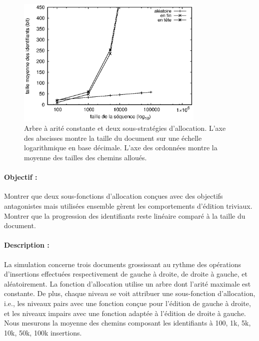 \begin{figure}
  \begin{center}
    \includegraphics[width=0.8\textwidth]{img/lseq/robin.eps}
    \caption{\label{repl:img:suballocation} Arbre à arité constante et deux
      sous-stratégies d'allocation. L'axe des abscisses montre la taille du
      document sur une échelle logarithmique en base décimale. L'axe des
      ordonnées montre la moyenne des tailles des chemins alloués.}
  \end{center}
\end{figure}

\paragraph{Objectif :} Montrer que deux sous-fonctions d'allocation conçues avec
des objectifs antagonistes mais utilisées ensemble gèrent les comportements
d'édition triviaux. Montrer que la progression des identifiants reste linéaire
comparé à la taille du document.

\paragraph{Description :} La simulation concerne trois documents grossissant au
rythme des opérations d'insertions effectuées respectivement de gauche à droite,
de droite à gauche, et aléatoirement. La fonction d'allocation utilise un arbre
dont l'arité maximale est constante. De plus, chaque niveau se voit attribuer
une sous-fonction d'allocation, i.e., les niveaux pairs avec une fonction conçue
pour l'édition de gauche à droite, et les niveaux impairs avec une fonction
adaptée à l'édition de droite à gauche. Nous mesurons la moyenne des chemins
composant les identifiants à 100, 1k, 5k, 10k, 50k, 100k insertions.

